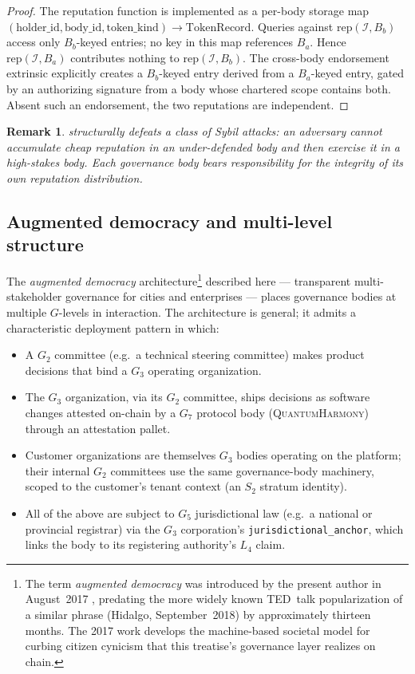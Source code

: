 \documentclass[11pt,a4paper,parskip=half-,DIV=12,headings=standardclasses]{scrartcl}
\theoremstyle{ncthm}
\theoremstyle{ncdef}
\newtheorem{remark}[theorem]{Remark}
\newcommand{\identity}{\mathcal{I}}
\newcommand{\qh}{\textsc{QuantumHarmony}}
\begin{document}
\begin{proof}
The reputation function is implemented as a per-body storage map
$(\text{holder\_id}, \text{body\_id}, \text{token\_kind}) \to
\text{TokenRecord}$. Queries against $\mathrm{rep}(\identity, B_b)$
access only $B_b$-keyed entries; no key in this map references $B_a$.
Hence $\mathrm{rep}(\identity, B_a)$ contributes nothing to
$\mathrm{rep}(\identity, B_b)$. The cross-body endorsement extrinsic
explicitly creates a $B_b$-keyed entry derived from a $B_a$-keyed
entry, gated by an authorizing signature from a body whose chartered
scope contains both. Absent such an endorsement, the two reputations
are independent.
\end{proof}

\begin{remark}
 structurally defeats a class of Sybil
attacks: an adversary cannot accumulate cheap reputation in an
under-defended body and then exercise it in a high-stakes body. Each
governance body bears responsibility for the integrity of its own
reputation distribution.
\end{remark}

\subsection{Augmented democracy and multi-level structure}

The \emph{augmented democracy}
architecture\footnote{The term \emph{augmented democracy} was
introduced by the present author in August~2017
\cite{cormier-augmented-democracy-2017}, predating the more widely
known TED~talk popularization of a similar phrase (Hidalgo, September~2018)
by approximately thirteen months. The 2017 work develops the
machine-based societal model for curbing citizen cynicism that this
treatise's governance layer realizes on chain.}
described here --- transparent multi-stakeholder governance for cities
and enterprises --- places governance bodies at multiple $G$-levels in
interaction.
The architecture is general; it admits a characteristic deployment
pattern in which:
\begin{itemize}
\item A $G_2$ committee (e.g.\ a technical steering committee) makes
  product decisions that bind a $G_3$ operating organization.
\item The $G_3$ organization, via its $G_2$ committee, ships
  decisions as software changes attested on-chain by a $G_7$ protocol
  body (\qh) through an attestation pallet.
\item Customer organizations are themselves $G_3$ bodies operating on
  the platform; their internal $G_2$ committees use the same
  governance-body machinery, scoped to the customer's tenant context
  (an $S_2$ stratum identity).
\item All of the above are subject to $G_5$ jurisdictional law (e.g.\
  a national or provincial registrar) via the $G_3$ corporation's
  \texttt{jurisdictional\_anchor}, which links the body to its
  registering authority's $L_4$ claim.
\end{itemize}
\end{document}
